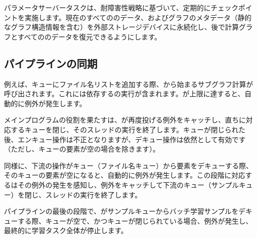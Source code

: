 \begin{content}
パラメータサーバータスクは、耐障害性戦略に基づいて、定期的にチェックポイントを実施します。現在のすべてののデータ、およびグラフのメタデータ（静的なグラフ構造情報を含む）を外部ストレージデバイスに永続化し、後で計算グラフとすべてののデータを復元できるようにします。

\subsection{パイプラインの同期}

例えば、キューにファイル名リストを追加する際、から始まるサブグラフ計算が呼び出されます。これには依存するの実行が含まれます。が上限に達すると、自動的に例外が発生します。

メインプログラムの役割を果たすは、が再度投げる例外をキャッチし、直ちに対応するキューを閉じ、そのスレッドの実行を終了します。キューが閉じられた後、エンキュー操作は不正となりますが、デキュー操作は依然として有効です（ただし、キューの要素が空の場合を除きます）。

同様に、下流の操作がキュー（ファイル名キュー）から要素をデキューする際、そのキューの要素が空になると、自動的に例外が発生します。この段階に対応するはその例外の発生を感知し、例外をキャッチして下流のキュー（サンプルキュー）を閉じ、スレッドの実行を終了します。

パイプラインの最後の段階で、がサンプルキューからバッチ学習サンプルをデキューする際、キューが空で、かつキューが閉じられている場合、例外が発生し、最終的に学習タスク全体が停止します。

\end{content}
